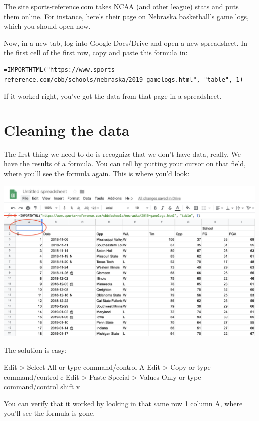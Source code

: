 \documentclass[]{book}
\begin{document}
The site sports-reference.com takes NCAA (and other league) stats and puts them online. For instance, \href{https://www.sports-reference.com/cbb/schools/nebraska/2019-gamelogs.html}{here's their page on Nebraska basketball's game logs}, which you should open now.

Now, in a new tab, log into Google Docs/Drive and open a new spreadsheet. In the first cell of the first row, copy and paste this formula in:

\begin{verbatim}
=IMPORTHTML("https://www.sports-reference.com/cbb/schools/nebraska/2019-gamelogs.html", "table", 1)
\end{verbatim}

If it worked right, you've got the data from that page in a spreadsheet.

\hypertarget{cleaning-the-data}{%
\section{Cleaning the data}\label{cleaning-the-data}}

The first thing we need to do is recognize that we don't have data, really. We have the results of a formula. You can tell by putting your cursor on that field, where you'll see the formula again. This is where you'd look:

\includegraphics[width=33.28in]{images/clean1}

The solution is easy:

Edit \textgreater{} Select All or type command/control A
Edit \textgreater{} Copy or type command/control c
Edit \textgreater{} Paste Special \textgreater{} Values Only or type command/control shift v

You can verify that it worked by looking in that same row 1 column A, where you'll see the formula is gone.
\end{document}
